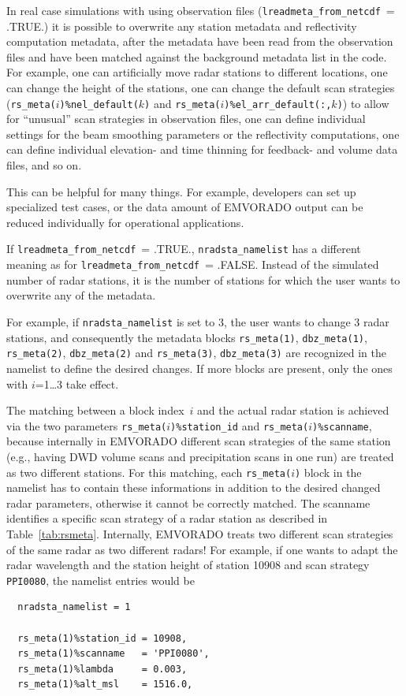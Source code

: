 \documentclass[10pt,a4paper,twoside,headinclude,footinclude,parskip=half]{scrartcl}
\newcommand{\myaktuellesection}{sec:intro}%
\newcommand{\labelsec}[1]{\label{#1}\renewcommand{\myaktuellesection}{#1}}%
\newcommand{\labelsec}[1]{\label{#1}}%
\newcommand{\srcform}[1]{\mbox{\texttt{#1}}\xspace}%
\begin{document}
\labelsec{sec:nmloverwrite}

In real case simulations with using observation files (\srcform{lreadmeta_from_netcdf}~= .TRUE.) it is possible
to overwrite any station metadata and reflectivity computation metadata, after the metadata have
been read from the observation files and have been matched against the background metadata list in the code.
For example, one can artificially move radar stations to different locations, one can
change the height of the stations, one can change the default scan strategies (\srcform{rs_meta($i$)\%nel_default($k$)} and \srcform{rs_meta($i$)\%el_arr_default(:,$k$)}) to allow for ``unusual'' scan
strategies in observation files, one can define individual settings for the beam smoothing parameters or the reflectivity computations, one can define individual elevation- and time thinning for feedback- and volume data files, and so on.

This can be helpful for many things. For example, developers can set up specialized test cases, or the data
amount of EMVORADO output can be reduced individually for operational applications.

If \srcform{lreadmeta_from_netcdf}~= .TRUE., \srcform{nradsta_namelist} has a different meaning as for
\srcform{lreadmeta_from_netcdf}~= .FALSE. Instead of the simulated number of radar stations, it
is the number of stations for which the user wants to overwrite any of the metadata.

For example, if \srcform{nradsta_namelist} is set to 3, the user wants to change 3 radar stations,
and consequently the metadata blocks \srcform{rs_meta(1)}, \srcform{dbz_meta(1)}, \srcform{rs_meta(2)}, \srcform{dbz_meta(2)} and \srcform{rs_meta(3)}, \srcform{dbz_meta(3)} are recognized in the namelist to define the
desired changes. If more blocks are present, only the ones with $i$=1\dots 3 take effect.

The matching between a block index~$i$ and the actual radar station is achieved via the two parameters
\srcform{rs_meta($i$)\%station_id}  and \srcform{rs_meta($i$)\%scanname}, because internally in EMVORADO different scan strategies of the same station (e.g., having DWD volume scans and precipitation scans in one run) are treated as two different stations.
For this matching, each \srcform{rs_meta($i$)} block in the namelist has to contain these informations
in addition to the desired changed radar parameters,
otherwise it cannot be correctly matched. The scanname identifies a
specific scan strategy of a radar station as described in Table~\ref{tab:rsmeta}. Internally, EMVORADO treats two different scan strategies
of the same radar as two different radars!
For example, if one wants to adapt the radar wavelength and the station height of station 10908 and scan strategy \srcform{PPI0080},
the namelist entries would be
\begin{verbatim}
  nradsta_namelist = 1

  rs_meta(1)%station_id = 10908,
  rs_meta(1)%scanname   = 'PPI0080',
  rs_meta(1)%lambda     = 0.003,
  rs_meta(1)%alt_msl    = 1516.0,
\end{verbatim}
\end{document}
